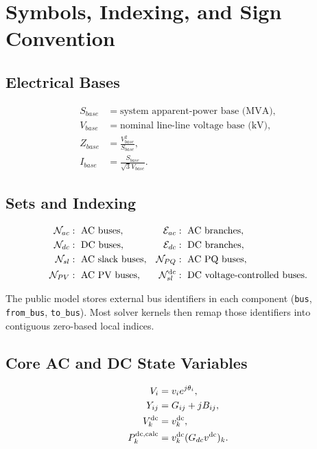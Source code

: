 \section{Symbols, Indexing, and Sign Convention}

\subsection{Electrical Bases}
\begin{align}
S_{base} &= \text{system apparent-power base (MVA)}, \\
V_{base} &= \text{nominal line-line voltage base (kV)}, \\
Z_{base} &= \frac{V_{base}^2}{S_{base}}, \\
I_{base} &= \frac{S_{base}}{\sqrt{3}V_{base}}.
\end{align}

\subsection{Sets and Indexing}

\begin{align}
\mathcal{N}_{ac} &:\text{ AC buses}, &
\mathcal{E}_{ac} &:\text{ AC branches}, \\
\mathcal{N}_{dc} &:\text{ DC buses}, &
\mathcal{E}_{dc} &:\text{ DC branches}, \\
\mathcal{N}_{sl} &:\text{ AC slack buses}, &
\mathcal{N}_{PQ} &:\text{ AC PQ buses}, \\
\mathcal{N}_{PV} &:\text{ AC PV buses}, &
\mathcal{N}_{sl}^{\mathrm{dc}} &:\text{ DC voltage-controlled buses}.
\end{align}

The public model stores external bus identifiers in each component
(\texttt{bus}, \texttt{from\_bus}, \texttt{to\_bus}).  Most solver kernels then remap
those identifiers into contiguous zero-based local indices.

\subsection{Core AC and DC State Variables}
\begin{align}
V_i &= v_i e^{j\theta_i}, \\
Y_{ij} &= G_{ij} + jB_{ij}, \\
V_k^{\mathrm{dc}} &= v_k^{\mathrm{dc}}, \\
P_k^{\mathrm{dc,calc}} &= v_k^{\mathrm{dc}}(G_{dc}v^{\mathrm{dc}})_k.
\end{align}

